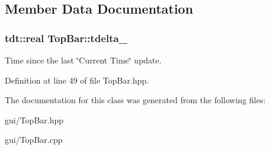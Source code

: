 \subsection{Member Data Documentation}
\subsubsection[{\texorpdfstring{tdelta\+\_\+}{tdelta_}}]{\setlength{\rightskip}{0pt plus 5cm}tdt\+::real Top\+Bar\+::tdelta\+\_\+\hspace{0.3cm}{\ttfamily [private]}}\hypertarget{class_top_bar_a0b1cc703a118cec101c50ba9b5fccba8}{}\label{class_top_bar_a0b1cc703a118cec101c50ba9b5fccba8}


Time since the last \char`\"{}\+Current Time\char`\"{} update. 



Definition at line 49 of file Top\+Bar.\+hpp.



The documentation for this class was generated from the following files\+:\begin{DoxyCompactItemize}
\item 
gui/Top\+Bar.\+hpp\item 
gui/Top\+Bar.\+cpp\end{DoxyCompactItemize}
